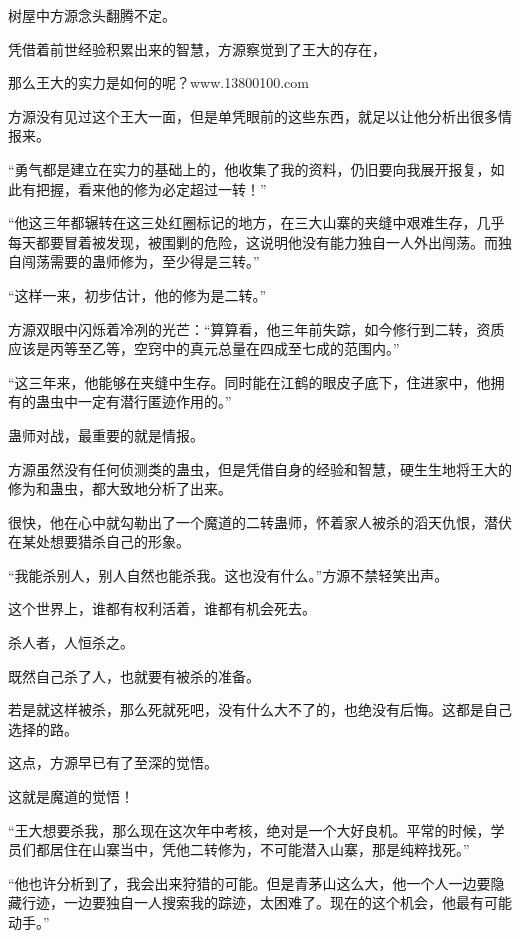 
\begin{this_body}

树屋中方源念头翻腾不定。

凭借着前世经验积累出来的智慧，方源察觉到了王大的存在，

那么王大的实力是如何的呢？www.13800100.com

方源没有见过这个王大一面，但是单凭眼前的这些东西，就足以让他分析出很多情报来。

“勇气都是建立在实力的基础上的，他收集了我的资料，仍旧要向我展开报复，如此有把握，看来他的修为必定超过一转！”

“他这三年都辗转在这三处红圈标记的地方，在三大山寨的夹缝中艰难生存，几乎每天都要冒着被发现，被围剿的危险，这说明他没有能力独自一人外出闯荡。而独自闯荡需要的蛊师修为，至少得是三转。”

“这样一来，初步估计，他的修为是二转。”

方源双眼中闪烁着冷冽的光芒：“算算看，他三年前失踪，如今修行到二转，资质应该是丙等至乙等，空窍中的真元总量在四成至七成的范围内。”

“这三年来，他能够在夹缝中生存。同时能在江鹤的眼皮子底下，住进家中，他拥有的蛊虫中一定有潜行匿迹作用的。”

蛊师对战，最重要的就是情报。

方源虽然没有任何侦测类的蛊虫，但是凭借自身的经验和智慧，硬生生地将王大的修为和蛊虫，都大致地分析了出来。

很快，他在心中就勾勒出了一个魔道的二转蛊师，怀着家人被杀的滔天仇恨，潜伏在某处想要猎杀自己的形象。

“我能杀别人，别人自然也能杀我。这也没有什么。”方源不禁轻笑出声。

这个世界上，谁都有权利活着，谁都有机会死去。

杀人者，人恒杀之。

既然自己杀了人，也就要有被杀的准备。

若是就这样被杀，那么死就死吧，没有什么大不了的，也绝没有后悔。这都是自己选择的路。

这点，方源早已有了至深的觉悟。

这就是魔道的觉悟！

“王大想要杀我，那么现在这次年中考核，绝对是一个大好良机。平常的时候，学员们都居住在山寨当中，凭他二转修为，不可能潜入山寨，那是纯粹找死。”

“他也许分析到了，我会出来狩猎的可能。但是青茅山这么大，他一个人一边要隐藏行迹，一边要独自一人搜索我的踪迹，太困难了。现在的这个机会，他最有可能动手。”


\end{this_body}
